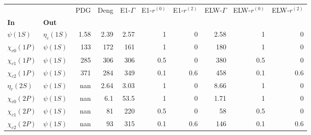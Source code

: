 \begin{tabular}{l|l|r|r|r|r|r|r|r|r}
\toprule
                &            &  PDG &  Deng &  E1-$\Gamma$ &  E1-$r^{(0)}$ &  E1-$r^{(2)}$ &  ELW-$\Gamma$ &  ELW-$r^{(0)}$ &  ELW-$r^{(2)}$ \\
\textbf{In} & \textbf{Out} &      &       &              &               &               &               &                &                \\
\midrule
\textbf{$\psi(1S)$} & \textbf{$\eta_{c}(1S)$} & 1.58 &  2.39 &         2.57 &             1 &             0 &          2.58 &              1 &              0 \\
\textbf{$\chi_{c0}(1P)$} & \textbf{$\psi(1S)$} &  133 &   172 &          161 &             1 &             0 &           180 &              1 &              0 \\
\textbf{$\chi_{c1}(1P)$} & \textbf{$\psi(1S)$} &  285 &   306 &          306 &           0.5 &             0 &           380 &            0.5 &              0 \\
\textbf{$\chi_{c2}(1P)$} & \textbf{$\psi(1S)$} &  371 &   284 &          349 &           0.1 &           0.6 &           458 &            0.1 &            0.6 \\
\textbf{$\eta_{c}(2S)$} & \textbf{$\psi(1S)$} &  nan &  2.64 &         3.03 &             1 &             0 &          8.66 &              1 &              0 \\
\textbf{$\chi_{c0}(2P)$} & \textbf{$\psi(1S)$} &  nan &   6.1 &         53.5 &             1 &             0 &          1.71 &              1 &              0 \\
\textbf{$\chi_{c1}(2P)$} & \textbf{$\psi(1S)$} &  nan &    81 &          220 &           0.5 &             0 &            58 &            0.5 &              0 \\
\textbf{$\chi_{c2}(2P)$} & \textbf{$\psi(1S)$} &  nan &    93 &          315 &           0.1 &           0.6 &           146 &            0.1 &            0.6 \\
\bottomrule
\end{tabular}
